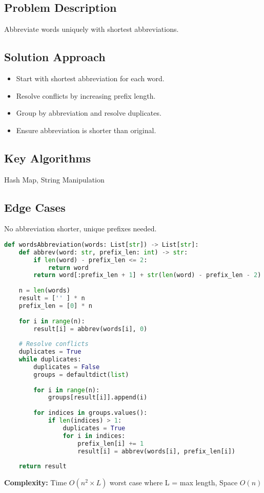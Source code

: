 \documentclass[10pt, a4paper]{article}
\begin{document}
\subsection*{Problem Description}
Abbreviate words uniquely with shortest abbreviations.

\subsection*{Solution Approach}
\begin{itemize}
    \item Start with shortest abbreviation for each word.
    \item Resolve conflicts by increasing prefix length.
    \item Group by abbreviation and resolve duplicates.
    \item Ensure abbreviation is shorter than original.
\end{itemize}

\subsection*{Key Algorithms}
Hash Map, String Manipulation

\subsection*{Edge Cases}
No abbreviation shorter, unique prefixes needed.

\begin{lstlisting}[language=Python]
def wordsAbbreviation(words: List[str]) -> List[str]:
    def abbrev(word: str, prefix_len: int) -> str:
        if len(word) - prefix_len <= 2:
            return word
        return word[:prefix_len + 1] + str(len(word) - prefix_len - 2) + word[-1]
    
    n = len(words)
    result = ['' ] * n
    prefix_len = [0] * n
    
    for i in range(n):
        result[i] = abbrev(words[i], 0)
    
    # Resolve conflicts
    duplicates = True
    while duplicates:
        duplicates = False
        groups = defaultdict(list)
        
        for i in range(n):
            groups[result[i]].append(i)
        
        for indices in groups.values():
            if len(indices) > 1:
                duplicates = True
                for i in indices:
                    prefix_len[i] += 1
                    result[i] = abbrev(words[i], prefix_len[i])
    
    return result
\end{lstlisting}
\textbf{Complexity:} Time $O(n^2 \times L)$ worst case where L = max length, Space $O(n)$
\end{document}
